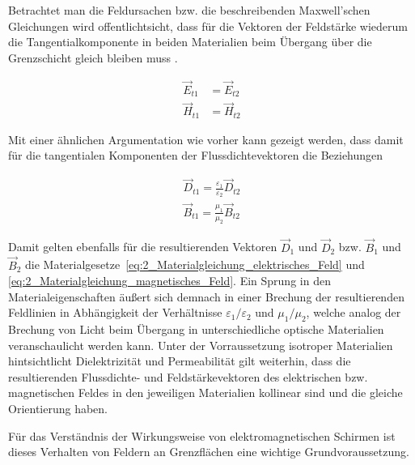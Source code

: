 Betrachtet man die Feldursachen bzw. die beschreibenden Maxwell'schen Gleichungen wird offentlichtsicht, dass für die Vektoren der Feldstärke wiederum die Tangentialkomponente in beiden Materialien beim Übergang über die Grenzschicht gleich bleiben muss \cite{EM_Schirmung}. 

\begin{subequations}
\begin{align}
    \vec E_{t1} &= \vec E_{t2} \label{subeq:2_Feldstaerketangentiale1} \\
    \vec H_{t1} &= \vec H_{t2} \label{subeq:2_Feldstaerketangentiale2}
    \end{align}
\label{eq:2_Feldstaerketangentiale}
\end{subequations}

Mit einer ähnlichen Argumentation wie vorher kann gezeigt werden, dass damit für die tangentialen Komponenten der Flussdichtevektoren die Beziehungen

\begin{subequations}
\begin{align}
    \vec D_{t1} = \frac{\varepsilon_1}{\varepsilon_2} \vec D_{t2} \label{subeq:2_Flussdichtetangentiale1} \\
    \vec B_{t1} = \frac{\mu_1}{\mu_2} \vec B_{t2} \label{subeq:2_Flussdichtetangentiale2}
\end{align}
\label{eq:2_Flussdichtetangentiale}
\end{subequations}

Damit gelten ebenfalls für die resultierenden Vektoren $\vec D_1$ und $\vec D_2$ bzw. $\vec B_1$ und $\vec B_2$ die Materialgesetze~\ref{eq:2_Materialgleichung_elektrisches_Feld} und \ref{eq:2_Materialgleichung_magnetisches_Feld}. Ein Sprung in den Materialeigenschaften äußert sich demnach in einer Brechung der resultierenden Feldlinien in Abhängigkeit der Verhältnisse $\varepsilon_1 / \varepsilon_2$ und $\mu_1 / \mu_2$, welche analog der Brechung von Licht beim Übergang in unterschiedliche optische Materialien veranschaulicht werden kann. Unter der Vorraussetzung isotroper Materialien hintsichtlicht Dielektrizität und Permeabilität gilt weiterhin, dass die resultierenden Flussdichte- und Feldstärkevektoren des elektrischen bzw. magnetischen Feldes in den jeweiligen Materialien kollinear sind und die gleiche Orientierung haben.

\par
\vspace{\linespace}

Für das Verständnis der Wirkungsweise von elektromagnetischen Schirmen ist dieses Verhalten von Feldern an Grenzflächen eine wichtige Grundvoraussetzung. 
















